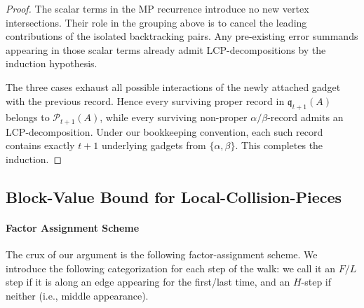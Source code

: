 \documentclass[12pt]{article}
\newcommand{\calP}{\mathcal{P}}
\newcommand{\q}{\mathfrak q}
\begin{document}
\begin{proof}
\medskip

The scalar terms in the MP recurrence introduce no new vertex
intersections. Their role in the grouping above is to cancel the leading
contributions of the isolated backtracking pairs. Any pre-existing error
summands appearing in those scalar terms already admit
LCP-decompositions by the induction hypothesis.

The three cases exhaust all possible interactions of the newly attached
gadget with the previous record. Hence every surviving proper record in
\(\q_{t+1}(A)\) belongs to \(\calP_{t+1}(A)\), while every surviving
non-proper \(\alpha/\beta\)-record admits an LCP-decomposition. Under our
bookkeeping convention, each such record contains exactly \(t+1\)
underlying gadgets from \(\{\alpha,\beta\}\). This completes the induction.
\end{proof}



\subsection{Block-Value Bound for Local-Collision-Pieces}

\paragraph{Factor Assignment Scheme}
The crux of our argument is the following factor-assignment scheme. We introduce the following categorization for each step of the walk: we call it an $F/L$ step if it is along an edge appearing for the first/last time, and an $H$-step if neither (i.e., middle appearance).
\end{document}
